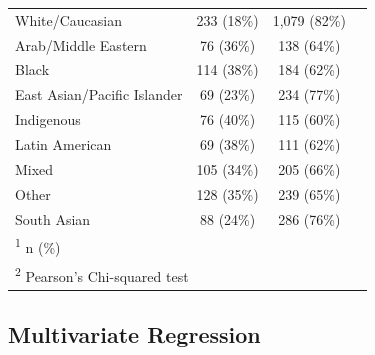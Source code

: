 \documentclass[
  letterpaper,
  DIV=11,
  numbers=noendperiod]{scrartcl}
\begin{document}
\begin{table}
\begin{tabular}{lccc}
\hspace{1em}White/Caucasian & 233 (18\%) & 1,079 (82\%) & \\
\hspace{1em}Arab/Middle Eastern & 76 (36\%) & 138 (64\%) & \\
\hspace{1em}Black & 114 (38\%) & 184 (62\%) & \\
\hspace{1em}East Asian/Pacific Islander & 69 (23\%) & 234 (77\%) & \\
\hspace{1em}Indigenous & 76 (40\%) & 115 (60\%) & \\
\hspace{1em}Latin American & 69 (38\%) & 111 (62\%) & \\
\hspace{1em}Mixed & 105 (34\%) & 205 (66\%) & \\
\hspace{1em}Other & 128 (35\%) & 239 (65\%) & \\
\hspace{1em}South Asian & 88 (24\%) & 286 (76\%) & \\
\bottomrule
\multicolumn{4}{l}{\rule{0pt}{1em}\textsuperscript{1} n (\%)}\\
\multicolumn{4}{l}{\rule{0pt}{1em}\textsuperscript{2} Pearson's Chi-squared test}\\
\end{tabular}
\endgroup{}
\end{table}

\hypertarget{multivariate-regression}{%
\subsection{Multivariate Regression}\label{multivariate-regression}}
\end{document}
